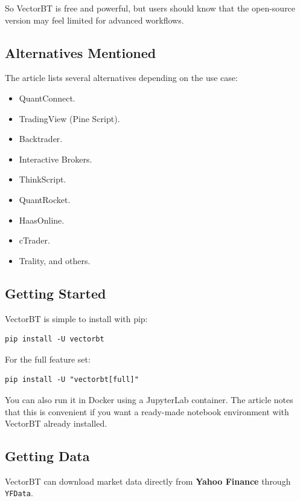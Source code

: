 \documentclass[12pt,openany]{book}
\begin{document}
So VectorBT is free and powerful, but users should know that the open-source version may feel limited for advanced workflows.

\subsection{Alternatives Mentioned}

The article lists several alternatives depending on the use case:

\begin{itemize}[leftmargin=*]
    \item QuantConnect.
    \item TradingView (Pine Script).
    \item Backtrader.
    \item Interactive Brokers.
    \item ThinkScript.
    \item QuantRocket.
    \item HaasOnline.
    \item cTrader.
    \item Trality, and others.
\end{itemize}

\subsection{Getting Started}

VectorBT is simple to install with pip:

\begin{Verbatim}[breaklines=true,breakanywhere=true,fontsize=\small]
pip install -U vectorbt
\end{Verbatim}

For the full feature set:

\begin{Verbatim}[breaklines=true,breakanywhere=true,fontsize=\small]
pip install -U "vectorbt[full]"
\end{Verbatim}

You can also run it in Docker using a JupyterLab container. The article notes that this is convenient if you want a ready-made notebook environment with VectorBT already installed.

\subsection{Getting Data}

VectorBT can download market data directly from \textbf{Yahoo Finance} through \texttt{YFData}.
\end{document}
